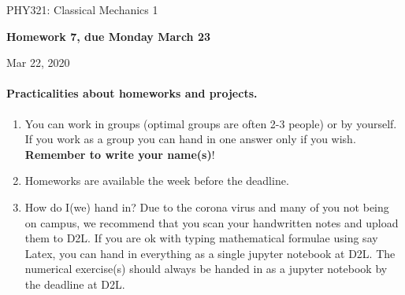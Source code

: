 \documentclass[%
oneside,                 %
final,                   %
10pt]{article}
\begin{document}

\newcommand{\exercisesection}[1]{\subsection*{#1}}






\thispagestyle{empty}

\begin{center}
{\LARGE\bf
\begin{spacing}{1.25}
PHY321: Classical Mechanics 1
\end{spacing}
}
\end{center}


\begin{center}
{\bf Homework 7, due Monday  March 23${}^{}$} \\ [0mm]
\end{center}

\begin{center}
\end{center}
    

\begin{center}
Mar 22, 2020
\end{center}

\vspace{1cm}


\paragraph{Practicalities about  homeworks and projects.}
\begin{enumerate}
\item You can work in groups (optimal groups are often 2-3 people) or by yourself. If you work as a group you can hand in one answer only if you wish. \textbf{Remember to write your name(s)}!

\item Homeworks are available  the week before the deadline. 

\item How do I(we)  hand in?  Due to the corona virus and many of you not being on campus, we recommend that you scan your handwritten notes and upload them to D2L. If you are ok with typing mathematical formulae using say Latex, you can hand in everything as a single jupyter notebook at D2L. The numerical exercise(s) should always be handed in as a jupyter notebook by the deadline at D2L. 
\end{enumerate}
\end{document}
